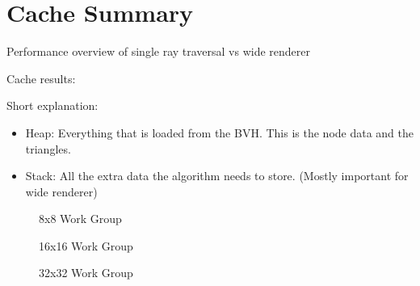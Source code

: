 \section{Cache Summary}

Performance overview of single ray traversal vs wide renderer
\begin{figure}[!htb]
	\scalebox{0.45}{}
\end{figure}

\begin{figure}[!htb]
	\scalebox{0.45}{}
\end{figure}


\newpage

Cache results:

Short explanation:
\begin{itemize}
	\item Heap: Everything that is loaded from the BVH. This is the node data and the triangles.
	\item Stack: All the extra data the algorithm needs to store. (Mostly important for wide renderer)
	
\end{itemize}

\begin{figure}[!htb]
	\scalebox{0.45}{}
	\caption{8x8 Work Group}
\end{figure}

\begin{figure}[!htb]
	\scalebox{0.45}{}
	\caption{16x16 Work Group}
\end{figure}

\begin{figure}[!htb]
	\scalebox{0.45}{}
	\caption{32x32 Work Group}
\end{figure}